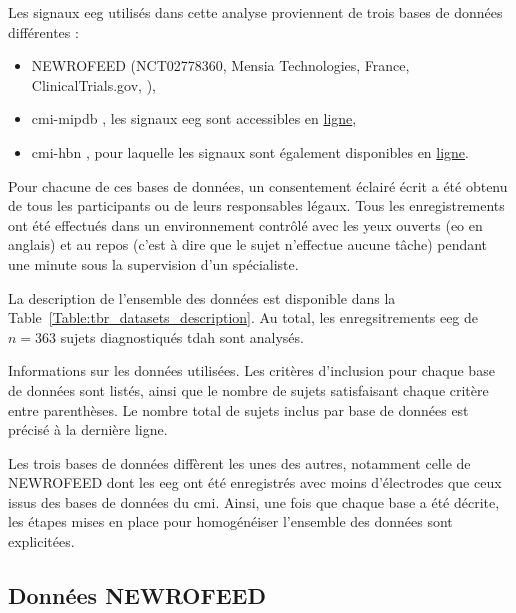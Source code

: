 Les signaux \gls{eeg} utilisés dans cette analyse proviennent de trois bases de données différentes :
\begin{itemize}
\item NEWROFEED (NCT02778360, Mensia Technologies, France, ClinicalTrials.gov, \citet{Bioulac2019}),
\item \gls{cmi-mipdb} \citep{Langer2017, Langer2017b}, les signaux \gls{eeg} sont accessibles en \href{http://fcon_1000.projects.nitrc.org/indi/cmi_eeg/eeg.html}{ligne},
\item \gls{cmi-hbn} \citep{Alexander2017, Alexander2017b}, pour laquelle les signaux sont également disponibles en 
\href{http://fcon_1000.projects.nitrc.org/indi/cmi_healthy_brain_network/sharing_neuro.html}{ligne}.
\end{itemize}
Pour chacune de ces bases de données, un consentement éclairé écrit a été obtenu de tous les participants ou de leurs responsables légaux. Tous les enregistrements
ont été effectués dans un environnement contrôlé avec les yeux ouverts (\gls{eo} en anglais) et au repos (c'est à dire que le sujet n'effectue aucune tâche) 
pendant une minute sous la supervision d'un spécialiste. 

La description de l'ensemble des données est disponible dans la Table~\ref{Table:tbr_datasets_description}. Au total, les enregsitrements \gls{eeg} de 
$n = 363$ sujets diagnostiqués \gls{tdah} sont analysés.

\begin{table}[h!]
  \centering
  \caption[Informations sur les données utilisées.]{Informations sur les données utilisées. Les critères d'inclusion pour chaque base de données sont listés, ainsi que le nombre de sujets satisfaisant
	chaque critère entre parenthèses. Le nombre total de sujets inclus par base de données est précisé à la dernière ligne.}
  
  \label{Table:tbr_datasets_description}
\end{table}

Les trois bases de données diffèrent les unes des autres, notamment celle de NEWROFEED dont les \gls{eeg} ont été enregistrés avec moins d'électrodes 
que ceux issus des bases de données du \gls{cmi}. Ainsi, une fois que chaque base a été décrite, les étapes
mises en place pour homogénéiser l'ensemble des données sont explicitées.

\subsection{Données NEWROFEED}

